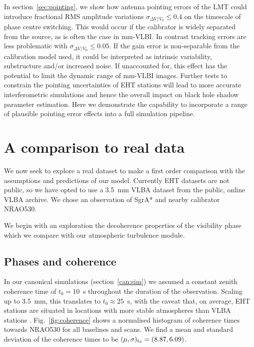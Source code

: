 In section~\ref{sec:pointing}, we show how antenna pointing errors of the LMT could introduce fractional RMS amplitude variations $\sigma_{\Delta V/V_0} \le 0.4$ on the timescale of phase centre switching. This would occur if the calibrator is widely separated from the source, as is often the case in mm-VLBI. In contrast tracking errors are less problematic with $\sigma_{\Delta V/V_0} \le 0.05$. If the gain error is non-separable from the calibration model used, it could be interpreted as intrinsic variability, substructure and/or increased noise. If unaccounted for, this effect has the potential to limit the dynamic range of mm-VLBI images. Further tests to constrain the pointing uncertainties of EHT stations will lead to more accurate interferometric simulations and hence the overall impact on black hole shadow parameter estimation. Here we demonstrate the capability to incorporate a range of plausible pointing error effects into a full simulation pipeline.  




 

\section{A comparison to real data}

We now seek to explore a real dataset to make a first order comparison with the assumptions and predictions of our model. Currently EHT datasets are not public, so we have opted to use a 3.5~mm VLBA dataset from the public, online VLBA archive. We chose an observation of SgrA* and nearby calibrator NRAO530. 

We begin with an exploration the decoherence properties of the visibility phase which we compare with our atmospheric turbulence module. 


\subsection{Phases and coherence}

In our canonical simulations (section~\ref{can:sim}) we assumed a constant zenith coherence time of $t_0 = 10$~s throughout the duration of the observation.  Scaling up to 3.5~mm, this translates to $t_0 \approx 25$~s, with the caveat that, on average, EHT stations are situated in locations with more stable atmospheres than VLBA stations . Fig.~\ref{fig:coherence} shows a normalised histogram of coherence times towards NRAO530 for all baselines and scans. We find a mean and standard deviation of the coherence times to be $(\mu, \sigma)_{\rm t_0} = (8.87,6.09)$.

